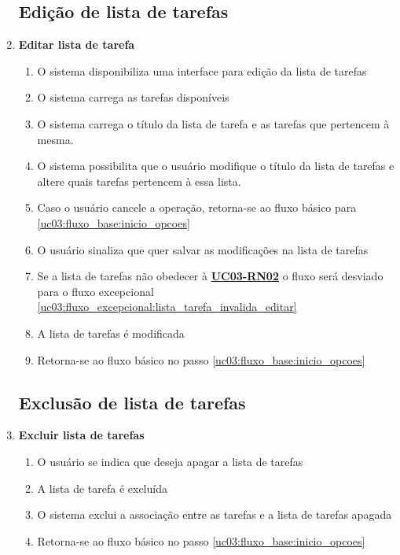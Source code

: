 \documentclass[
	12pt,				%
	oneside,			%
	a4paper,			%
	english,			%
	brazil,				%
	]{abntex2}
\begin{document}
\begin{enumerate}[label=\textbf{UC03-FA{\arabic*}},font=\normalsize]
    \subsection{Edição de lista de tarefas}
    \item \textbf{\normalsize Editar lista de tarefa}
    \label{uc03:fluxo_alternativo:editar_lista_tarefa}
    \begin{enumerate}[label={\arabic*}.]
        \item O sistema disponibiliza uma interface para edição da lista de tarefas
        \item O sistema carrega as tarefas disponíveis
        \item O sistema carrega o título da lista de tarefa e as tarefas que pertencem à mesma.
        \item O sistema possibilita que o usuário modifique o título da lista de tarefas e altere quais tarefas pertencem à essa lista. \label{uc03:fluxo_alternativo:editar_lista_tarefa:inicio_interacao}
        \item Caso o usuário cancele a operação, retorna-se ao fluxo básico para \ref{uc03:fluxo_base:inicio_opcoes}
        \item O usuário sinaliza que quer salvar as modificações na lista de tarefas
        \item Se a lista de tarefas não obedecer à \textbf{\hyperref[uc03:rn02_validar_lista_tarefa]{UC03-RN02}} o fluxo será desviado para o fluxo excepcional \ref{uc03:fluxo_excepcional:lista_tarefa_invalida_editar}
        \item A lista de tarefas é modificada
        \item Retorna-se ao fluxo básico no passo \ref{uc03:fluxo_base:inicio_opcoes}
    \end{enumerate}
    
    \subsection{Exclusão de lista de tarefas}
    \item \textbf{\normalsize Excluir lista de tarefas}
    \label{uc03:fluxo_alternativo:excluir_lista_tarefa}
    \begin{enumerate}[label={\arabic*}.]
        \item O usuário se indica que deseja apagar a lista de tarefas
        \item A lista de tarefa é excluída
        \item O sistema exclui a associação entre as tarefas e a lista de tarefas apagada
        \item Retorna-se ao fluxo básico no passo \ref{uc03:fluxo_base:inicio_opcoes}
    \end{enumerate}
\end{enumerate}
\end{document}
